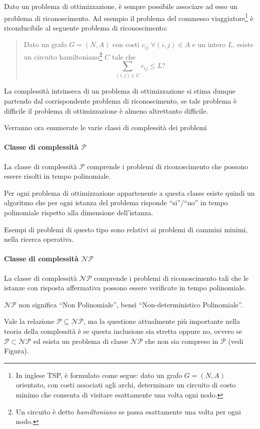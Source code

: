 Dato un problema di ottimizzazione, è sempre possibile associare ad esso un problema di 
riconoscimento. Ad esempio il problema del commesso 
viaggiatore\footnote{In inglese \ac{TSP}, è formulato come segue: dato un grafo $G = 
(N, A)$ orientato, con costi associati agli archi, determinare un circuito di costo 
minimo che consenta di visitare esattamente una volta ogni nodo.} è riconducibile al 
seguente problema di riconoscimento:
\begin{quotation}
Dato un grafo $G = (N, A)$ con costi $c_{ij} \; \forall (i,j) \in A$ e 
un intero $L$, esiste un circuito hamiltoniano\footnote{Un circuito è detto 
\emph{hamiltoniano} se passa esattamente una volta per ogni nodo.} $C$ tale che
\begin{displaymath}
 \sum_{(i,j) \in C}c_{ij} \leq L\text{?}
\end{displaymath}
\end{quotation}
La complessità intrinseca di un problema di ottimizzazione si stima dunque partendo dal 
corrispondente problema di riconoscimento, se tale problema è difficile il problema di 
ottimizzazione è almeno altrettanto difficile.

Verranno ora enumerate le varie classi di complessità dei problemi

\paragraph{Classe di complessità $\mathcal{P}$}
\begin{mydef}
La classe di complessità $\mathcal{P}$ comprende i problemi di riconoscimento che possono 
essere risolti in tempo polinomiale.
\end{mydef}
Per ogni problema di ottimizzazione appartenente a questa classe esiste quindi un 
algoritmo che per ogni istanza del problema risponde ``si''/``no'' in tempo polinomiale 
rispetto alla dimensione dell'istanza.

Esempi di problemi di questo tipo sono relativi ai problemi di cammini minimi, nella 
ricerca operativa.

\paragraph{Classe di complessità $\mathcal{NP}$}
\begin{mydef}
 La classe di complessità $\mathcal{NP}$ comprende i problemi di riconoscimento 
tali che le istanze con risposta affermativa possono essere verificate in tempo 
polinomiale.
\end{mydef}
$\mathcal{NP}$ non significa ``Non Polinomiale'', bensì ``Non-deterministico 
Polinomiale''.



Vale la relazione $\mathcal{P} \subseteq \mathcal{NP}$, ma la questione attualmente più 
importante nella teoria della complessità è se questa inclusione sia stretta oppure 
no, ovvero se $\mathcal{P} \subset \mathcal{NP}$ ed esista un problema di classe 
$\mathcal{NP}$ che non sia compreso in $\mathcal{P}$ \cite{GasarchPoll} (vedi Figura).
